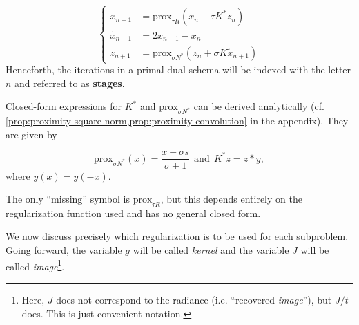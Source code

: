 \documentclass[twocolumn,twoside,a4paper,10pt]{IEEEtran}
\begin{document}
\begin{equation}\label{eq:iterates}
  \left\{
  \begin{split}
    x_{n+1} & = \text{prox}_{\tau R}(x_n - \tau K^*z_n) \\
    \tilde{x}_{n+1} & = 2x_{n+1} - x_n \\
    z_{n+1} & = \text{prox}_{\sigma N^*}(z_n + \sigma K\tilde{x}_{n+1})
  \end{split}
  \right.
\end{equation}
Henceforth, the iterations in a primal-dual schema will be indexed with the letter \(n\) and referred to as \textbf{stages}.

Closed-form expressions for \(K^*\) and \(\text{prox}_{\sigma N^*}\) can be derived analytically (cf. \cref{prop:proximity-square-norm,prop:proximity-convolution} in the appendix). They are given by

\begin{equation}\label{eq:primal-dual-analytical}
  \text{prox}_{\sigma N^*}(x) = \frac{x-\sigma s}{\sigma + 1} ~~ \text{and} ~~ K^*z = z\ast \overline{y},
\end{equation}
where \(\overline{y}(x) = y(-x)\).

The only ``missing'' symbol is \(\text{prox}_{\tau R}\), but this depends entirely on the regularization function used and has no general closed form.

We now discuss precisely which regularization is to be used for each subproblem. Going forward, the variable \(g\) will be called \textit{kernel} and the variable \(J\) will be called \textit{image}\footnote{Here, \(J\) does not correspond to the radiance (i.e. ``recovered \textit{image}''), but \(J/t\) does. This is just convenient notation.}.
\end{document}
